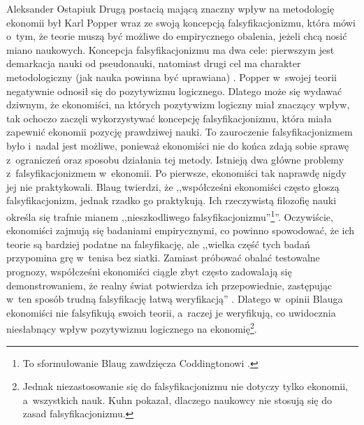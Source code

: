 \begin{artplenv}{Aleksander Ostapiuk}
Drugą postacią mającą znaczny wpływ na metodologię ekonomii był Karl Popper wraz ze swoją koncepcją falsyfikacjonizmu, która
mówi o~tym, że teorie muszą być możliwe do empirycznego obalenia, jeżeli chcą nosić miano naukowych. Koncepcja
falsyfikacjonizmu ma dwa cele: pierwszym jest demarkacja nauki od pseudonauki,
natomiast drugi cel ma charakter metodologiczny (jak nauka powinna być uprawiana)
\parencite{hands_popper_1993}.
Popper w~swojej teorii negatywnie odnosił się do pozytywizmu logicznego.
Dlatego może się wydawać dziwnym, że ekonomiści, na których pozytywizm logiczny miał znaczący wpływ, tak ochoczo zaczęli
wykorzystywać koncepcję falsyfikacjonizmu, która miała zapewnić ekonomii pozycję prawdziwej nauki. To zauroczenie
falsyfikacjonizmem było i~nadal jest możliwe, ponieważ ekonomiści nie do końca zdają sobie sprawę z~ograniczeń oraz sposobu
działania tej metody. Istnieją dwa główne problemy z~falsyfikacjonizmem w~ekonomii. Po pierwsze, ekonomiści tak naprawdę
nigdy jej nie praktykowali. Blaug
\parencite*[s.~175]{blaug_metodologia_1995}
twierdzi, że ,,współcześni ekonomiści często
głoszą falsyfikacjonizm, jednak rzadko go praktykują. Ich rzeczywistą filozofię nauki określa się trafnie mianem
,,nieszkodliwego falsyfikacjonizmu''\footnote{To sformułowanie Blaug zawdzięcza Coddingtonowi
\parencite[s.~542]{coddington_rationale_1975}.
}''.
Oczywiście, ekonomiści zajmują się badaniami empirycznymi, co powinno
spowodować, że ich teorie są bardziej podatne na falsyfikację, ale ,,wielka część tych badań przypomina grę w~tenisa
bez siatki. Zamiast próbować obalać testowalne prognozy, współcześni ekonomiści ciągle zbyt często zadowalają się
demonstrowaniem, że realny świat potwierdza ich przepowiednie, zastępując w~ten sposób trudną falsyfikację łatwą
weryfikacją''
\parencite[s.~348]{blaug_metodologia_1995}.
Dlatego w~opinii Blauga ekonomiści nie falsyfikują swoich
teorii, a~raczej je weryfikują, co uwidocznia niesłabnący wpływ pozytywizmu logicznego na ekonomię\footnote{Jednak
niezastosowanie się do falsyfikacjonizmu nie dotyczy tylko ekonomii, a~wszystkich nauk. Kuhn
\parencite*{kuhn_structure_1962}
pokazał, dlaczego naukowcy nie stosują się do zasad falsyfikacjonizmu.}. 


\end{artplenv}
